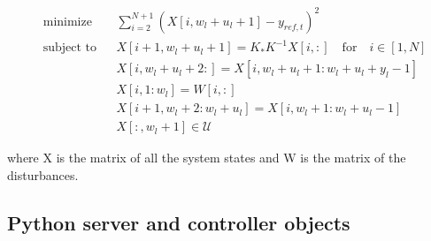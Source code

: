 \begin{subequations}\label{eq:sparse_optimal_control_problem}
    \begin{align}
        & \text{minimize}
        & & \sum_{i=2}^{N + 1} \left(X[i, w_l + u_l + 1] - y_{ref, t}\right)^2 \\
        & \text{subject to}
        & & X[i+1, w_l + u_l + 1] = K_*K^{-1}X[i, :] \quad \text{for} \quad
        i\in[1, N]\\
        &&& X[i, w_l + u_l + 2: ] = X[i, w_l+ u_l + 1: w_l + u_l + y_l - 1]\\
        &&& X[i, 1:w_l] = W[i, :] \\
        &&& X[i+1, w_l + 2: w_l + u_l] = X[i, w_l + 1: w_l + u_l - 1] \\
        &&& X[:, w_l + 1] \in \mathcal{U}
    \end{align}
\end{subequations}

where X is the matrix of all the system states and W is the matrix of the
disturbances.

\subsection{Python server and controller objects}


\clearpage

